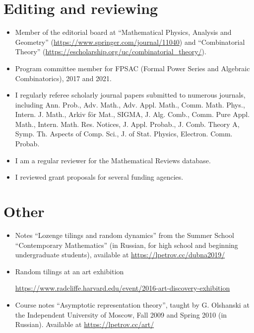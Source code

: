 \documentclass[letterpaper,11pt]{article}
\begin{document}
\section*{Editing and reviewing}

\begin{itemize}
	\item
	Member of the editorial board at ``Mathematical Physics, Analysis and Geometry'' (\url{https://www.springer.com/journal/11040}) and ``Combinatorial Theory'' (\url{https://escholarship.org/uc/combinatorial_theory/}).
	\item Program committee member for FPSAC (Formal Power Series and Algebraic Combinatorics),
		2017 and 2021.
	\item 
	I regularly referee scholarly journal papers submitted to numerous journals, 
	including
	Ann. Prob., Adv. Math., Adv. Appl. Math., Comm. Math. Phys., Intern. J. Math.,
	Arkiv f\"or Mat., SIGMA, J. Alg. Comb., Comm. Pure Appl. Math., Intern. Math.
	Res. Notices, J. Appl. Probab., J. Comb. Theory A, Symp. Th. Aspects of Comp.
	Sci., J. of Stat. Physics, Electron. Comm. Probab. 
	\item
	I am a regular
	reviewer for the Mathematical Reviews database. 
	\item
	I reviewed grant proposals for several funding agencies.
\end{itemize}

\section*{Other}

\begin{itemize}
	\item
	Notes ``Lozenge tilings and random dynamics'' from the 
	Summer School ``Contemporary Mathematics'' (in Russian, for 
	high school and beginning undergraduate students), 
	available at
	\url{https://lpetrov.cc/dubna2019/}

	\item
	Random tilings at an art exhibition

	\url{https://www.radcliffe.harvard.edu/event/2016-art-discovery-exhibition}
	\item
	Course notes 
	``Asymptotic representation theory'',
	taught by G. Olshanski 
	at the Independent University of Moscow,
	Fall 2009 and Spring 2010 (in Russian). 
	Available at \url{https://lpetrov.cc/art/}

\end{itemize}
\end{document}
